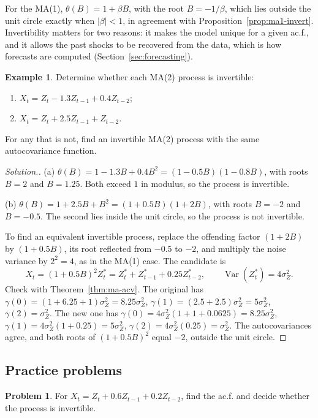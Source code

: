 \documentclass[11pt,a4paper]{article}
\theoremstyle{definition}
\newtheorem{exa}[thm]{Example}
\newtheorem{problemx}{Problem}[subsection]
\newenvironment{problem}{\begin{problemx}}{\end{problemx}}
\newenvironment{solution}
  {\renewcommand{\qedsymbol}{}\begin{proof}[\textit{Solution}.]}
  {\end{proof}}
\DeclareMathOperator{\Var}{Var}
\begin{document}
For the MA(1), $\theta(B) = 1 + \beta B$, with the root $B = -1/\beta$, which lies outside the unit circle exactly when $|\beta| < 1$, in
agreement with Proposition~\ref{prop:ma1-invert}. Invertibility matters for two reasons: it makes the model unique for
a given ac.f., and it allows the past shocks to be recovered from the data, which is how forecasts are
computed (Section~\ref{sec:forecasting}).

\begin{exa}\label{exa:ma2-invert}
Determine whether each MA(2) process is invertible:
\begin{enumerate}[label=(\alph*)]
\item $X_t = Z_t - 1.3Z_{t-1} + 0.4Z_{t-2}$;
\item $X_t = Z_t + 2.5Z_{t-1} + Z_{t-2}$.
\end{enumerate}
For any that is not, find an invertible MA(2) process with the same autocovariance function.
\end{exa}

\begin{solution}
(a) $\theta(B) = 1 - 1.3B + 0.4B^2 = (1 - 0.5B)(1 - 0.8B)$, with roots $B = 2$ and $B = 1.25$. Both exceed $1$ in modulus, so the process is
invertible.

(b) $\theta(B) = 1 + 2.5B + B^2 = (1 + 0.5B)(1 + 2B)$, with roots $B = -2$ and $B = -0.5$. The second lies inside the unit circle, so
the process is not invertible.

To find an equivalent invertible process, replace the offending factor $(1 + 2B)$ by $(1 + 0.5B)$, its root reflected
from $-0.5$ to $-2$, and multiply the noise variance by $2^2 = 4$, as in the MA(1) case. The candidate is
\[
X_t = (1 + 0.5B)^2Z_t^* = Z_t^* + Z_{t-1}^* + 0.25Z_{t-2}^* , \qquad \Var(Z_t^*) = 4\sigma_Z^2 .
\]
Check with Theorem~\ref{thm:ma-acv}. The original has $\gamma(0) = (1 + 6.25 + 1)\sigma_Z^2 = 8.25\sigma_Z^2$, $\gamma(1) = (2.5 + 2.5)\sigma_Z^2 = 5\sigma_Z^2$,
$\gamma(2) = \sigma_Z^2$. The new one has $\gamma(0) = 4\sigma_Z^2(1 + 1 + 0.0625) = 8.25\sigma_Z^2$, $\gamma(1) = 4\sigma_Z^2(1 + 0.25) = 5\sigma_Z^2$, $\gamma(2) = 4\sigma_Z^2(0.25) = \sigma_Z^2$. The
autocovariances agree, and both roots of $(1 + 0.5B)^2$ equal $-2$, outside the unit circle.
\end{solution}

\subsection{Practice problems}
\begin{problem}\label{prob:ma2-acf}
For $X_t = Z_t + 0.6Z_{t-1} + 0.2Z_{t-2}$, find the ac.f. and decide whether the process is invertible.
\end{problem}
\end{document}
